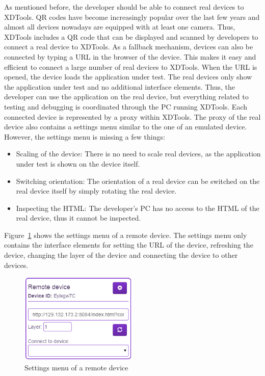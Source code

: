 As mentioned before, the developer should be able to connect real devices to XDTools. QR codes have become increasingly popular over the last few years and almost all devices nowadays are equipped with at least one camera. Thus, XDTools includes a QR code that can be displayed and scanned by developers to connect a real device to XDTools. As a fallback mechanism, devices can also be connected by typing a URL in the browser of the device. This makes it easy and efficient to connect a large number of real devices to XDTools. When the URL is opened, the device loads the application under test. The real devices only show the application under test and no additional interface elements. Thus, the developer can use the application on the real device, but everything related to testing and debugging is coordinated through the PC running XDTools. Each connected device is represented by a proxy within XDTools. The proxy of the real device also contains a settings menu similar to the one of an emulated device. However, the settings menu is missing a few things:
\begin{itemize}
	\item Scaling of the device: There is no need to scale real devices, as the application under test is shown on the device itself.
	\item Switching orientation: The orientation of a real device can be switched on the real device itself by simply rotating the real device.
	\item Inspecting the HTML: The developer's PC has no access to the HTML of the real device, thus it cannot be inspected.
\end{itemize}
Figure~\ref{fig:settings_menu_remote} shows the settings menu of a remote device. The settings menu only contains the interface elements for setting the URL of the device, refreshing the device, changing the layer of the device and connecting the device to other devices.

\begin{figure}[H]
  \centering
    \includegraphics[width=0.5\textwidth]{images/screenshots/remote_device.png}
	\caption[Screenshot: Settings menu remote device]{Settings menu of a remote device}
	\label{fig:settings_menu_remote}
\end{figure}


